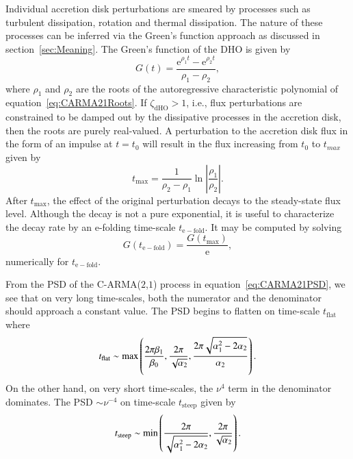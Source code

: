 \documentclass[a4paper,fleqn,usenatbib]{mnras}
\begin{document}
Individual accretion disk perturbations are smeared by processes such as turbulent dissipation, rotation and thermal dissipation. The nature of these processes can be inferred via the Green's function approach as discussed in section~\ref{sec:Meaning}. The Green's function of the DHO is given by
\begin{equation}\label{eq:DHOGFunc}
G(t) = \frac{\mathrm{e}^{\rho_{1}t} - \mathrm{e}^{\rho_{2}t}}{\rho_{1} - \rho_{2}},
\end{equation}
where $\rho_{1}$ and $\rho_{2}$ are the roots of the autoregressive characteristic polynomial of equation~\eqref{eq:CARMA21Roots}. If $\zeta_{\mathrm{dHO}} > 1$, i.e., flux perturbations are constrained to be damped out by the dissipative processes in the accretion disk, then the roots are purely real-valued. A perturbation to the accretion disk flux in the form of an impulse at $t = t_{0}$ will result in the flux increasing from $t_{0}$ to $t_{max}$ given by
\begin{equation}\label{eq:maxT}
t_{\mathrm{max}} = \frac{1}{\rho_{2} - \rho_{1}} \ln \left| \frac{\rho_{1}}{\rho_{2}} \right|.
\end{equation}
After $t_{\mathrm{max}}$, the effect of the original perturbation decays to the steady-state flux level. Although the decay is not a pure exponential, it is useful to characterize the decay rate by an e-folding time-scale $t_{\mathrm{e-fold}}$. It may be computed by solving
\begin{equation}\label{eq:TEFold}
G(t_{\mathrm{e-fold}}) = \frac{G(t_{\mathrm{max}})}{\mathrm{e}},
\end{equation} 
numerically for $t_{\mathrm{e-fold}}$.

From the PSD of the C-ARMA($2$,$1$) process in equation~\eqref{eq:CARMA21PSD}, we see that on very long time-scales, both the numerator and the denominator should approach a constant value. The PSD begins to flatten on time-scale $t_{\mathrm{flat}}$ where 
\begin{equation}\label{eq:TFLAT}
t_{\mathrm{flat}} \sim \max \left( \frac{2\pi \beta_{1}}{\beta_{0}},\frac{2\pi}{\sqrt{\alpha_{2}}},\frac{2\pi \sqrt{\alpha_{1}^{2}-2\alpha_{2}}}{\alpha_{2}} \right).
\end{equation}
On the other hand, on very short time-scales, the $\nu^{4}$ term in the denominator dominates. The PSD $\sim \nu^{-4}$ on time-scale $t_{\mathrm{steep}}$ given by
\begin{equation}\label{eq:STEEP}
t_{\mathrm{steep}} \sim \min \left( \frac{2\pi}{\sqrt{\alpha_{1}^{2} - 2\alpha_{2}}}, \frac{2\pi}{\sqrt{\alpha_{2}}}  \right).
\end{equation}
\end{document}
